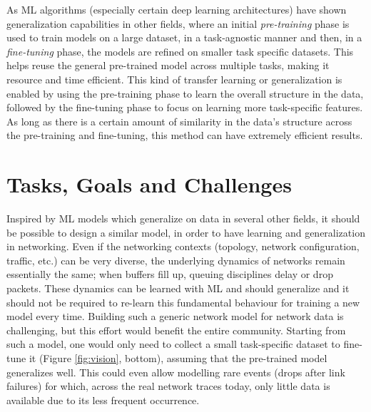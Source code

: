 As ML algorithms (especially certain deep learning architectures) have shown generalization capabilities\cite{generalizingdnn} in other fields, where an initial \emph{pre-training} phase is used to train models on a large dataset, in a task-agnostic manner and then, in a \emph{fine-tuning} phase, the models are refined on smaller task specific datasets. This helps reuse the general pre-trained model across multiple tasks, making it resource and time efficient. This kind of transfer learning or generalization\cite{transferng} is enabled by using the pre-training phase to learn the overall structure in the data, followed by the fine-tuning phase to focus on learning more task-specific features. As long as there is a certain amount of similarity in the data's structure across the pre-training and fine-tuning, this method can have extremely efficient results.

\section{Tasks, Goals and Challenges}
\label{sec:task}

Inspired by ML models which generalize on data in several other fields, it should be possible to design a similar model, in order to have learning and generalization in networking. Even if the networking contexts (topology, network configuration, traffic, etc.) can be very diverse, the underlying dynamics of networks remain essentially the same; \eg when buffers fill up, queuing disciplines delay or drop packets. These dynamics can be learned with ML and should generalize and it should not be required to re-learn this fundamental behaviour for training a new model every time. Building such a generic network model for network data is challenging, but this effort would benefit the entire community. Starting from such a model, one would only need to collect a small task-specific dataset to fine-tune it (Figure \ref{fig:vision}, bottom), assuming that the pre-trained model generalizes well. This could even allow modelling rare events (\eg drops after link failures) for which, across the real network traces today, only little data is available due to its less frequent occurrence.

